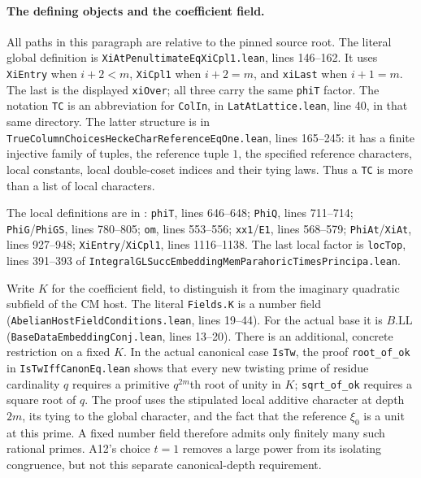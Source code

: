 \documentclass[11pt]{article}
\theoremstyle{definition}\newtheorem{definition}[theorem]{Definition}\newtheorem{remark}[theorem]{Remark}
\begin{document}
\paragraph{The defining objects and the coefficient field.}
All paths in this paragraph are relative to the pinned source root.
The literal global definition is
\nolinkurl{XiAtPenultimateEqXiCpl1.lean}, lines 146--162.
It uses \texttt{XiEntry} when $i+2<m$, \texttt{XiCpl1}
when $i+2=m$, and \texttt{xiLast} when $i+1=m$.
The last is the displayed \texttt{xiOver}; all three carry
the same \texttt{phiT} factor.
The notation \texttt{TC} is an abbreviation for \texttt{ColIn},
in \texttt{LatAtLattice.lean}, line 40, in that same directory.
The latter structure is in
\nolinkurl{TrueColumnChoicesHeckeCharReferenceEqOne.lean},
lines 165--245: it has a finite injective family of tuples,
the reference tuple $1$, the specified reference characters,
local constants, local double-coset indices and their tying laws.
Thus a \texttt{TC} is more than a list of local characters.

The local definitions are in
:
\texttt{phiT}, lines 646--648;
\texttt{PhiQ}, lines 711--714;
\texttt{PhiG}/\texttt{PhiGS}, lines 780--805;
\texttt{om}, lines 553--556;
\texttt{xx1}/\texttt{E1}, lines 568--579;
\texttt{PhiAt}/\texttt{XiAt}, lines 927--948;
\texttt{XiEntry}/\texttt{XiCpl1}, lines 1116--1138.
The last local factor is \texttt{locTop}, lines 391--393 of
\nolinkurl{IntegralGLSuccEmbeddingMemParahoricTimesPrincipa.lean}.

Write $K$ for the coefficient field, to distinguish it from the
imaginary quadratic subfield of the CM host.  The literal
\texttt{Fields.K} is a number field
(\nolinkurl{AbelianHostFieldConditions.lean}, lines 19--44).
For the actual base it is $B.\mathrm{LL}$
(\nolinkurl{BaseDataEmbeddingConj.lean}, lines 13--20).
There is an additional, concrete restriction on a fixed $K$.
In the actual canonical case \texttt{IsTw}, the proof
\texttt{root\_of\_ok} in \texttt{IsTwIffCanonEq.lean}
shows that every new twisting prime of residue cardinality $q$
requires a primitive $q^{2m}$th root of unity in $K$;
\texttt{sqrt\_of\_ok} requires a square root of $q$.
The proof uses the stipulated local additive character at depth
$2m$, its tying to the global character, and the fact that the
reference $\xi_0$ is a unit at this prime.  A fixed number field
therefore admits only finitely many such rational primes.
A12's choice $t=1$ removes a large power from its isolating
congruence, but not this separate canonical-depth requirement.
\end{document}
